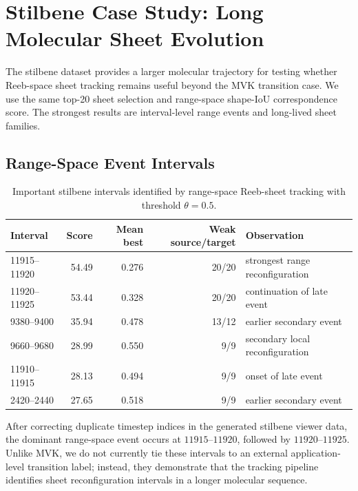 \section{Stilbene Case Study: Long Molecular Sheet Evolution}
\label{sec:results-stilbene}

The stilbene dataset provides a larger molecular trajectory for testing whether
Reeb-space sheet tracking remains useful beyond the MVK transition case. We use
the same top-20 sheet selection and range-space shape-IoU correspondence score.
The strongest results are interval-level range events and long-lived sheet
families.

\subsection{Range-Space Event Intervals}

\begin{table}[t]
  \centering
  \caption{Important stilbene intervals identified by range-space Reeb-sheet
  tracking with threshold \(\theta=0.5\).}
  \label{tab:stilbene-events}
  \begin{tabular}{lrrrl}
    \toprule
    Interval & Score & Mean best & Weak source/target & Observation \\
    \midrule
    11915--11920 & 54.49 & 0.276 & 20/20 & strongest range reconfiguration \\
    11920--11925 & 53.44 & 0.328 & 20/20 & continuation of late event \\
    9380--9400 & 35.94 & 0.478 & 13/12 & earlier secondary event \\
    9660--9680 & 28.99 & 0.550 & 9/9 & secondary local reconfiguration \\
    11910--11915 & 28.13 & 0.494 & 9/9 & onset of late event \\
    2420--2440 & 27.65 & 0.518 & 9/9 & earlier secondary event \\
    \bottomrule
  \end{tabular}
\end{table}

After correcting duplicate timestep indices in the generated stilbene viewer
data, the dominant range-space event occurs at \(11915\)--\(11920\), followed by
\(11920\)--\(11925\). Unlike MVK, we do not currently tie these intervals to an
external application-level transition label; instead, they demonstrate that the
tracking pipeline identifies sheet reconfiguration intervals in a longer
molecular sequence.

